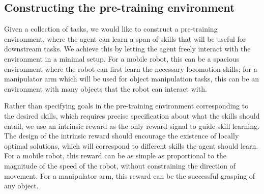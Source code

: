 \documentclass{article} %
\begin{document}


\subsection{Constructing the pre-training environment}%
\label{section:method:pretraining}

Given a collection of tasks, we would like to construct a pre-training environment, where the agent can learn a span of skills that will be useful for downstream tasks. We achieve this by letting the agent freely interact with the environment in a minimal setup.
For a mobile robot, this can be a spacious environment where the robot can first learn the necessary locomotion skills; for a manipulator arm which will be used for object manipulation tasks, this can be an environment with many objects that the robot can interact with.

Rather than specifying goals in the pre-training environment corresponding to the desired skills, which requires precise specification about what the skills should entail, we use an intrinsic reward as the only reward signal to guide skill learning.
The design of the intrinsic reward should encourage the existence of locally optimal solutions, which will correspond to different skills the agent should learn.
For a mobile robot, this reward can be as simple as proportional to the magnitude of the speed of the robot, without constraining the direction of movement.
For a manipulator arm, this reward can be the successful grasping of any object.
\end{document}
